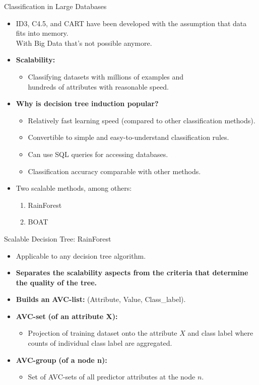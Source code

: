 \begin{frame}{Classification in Large Databases}
	\begin{itemize}
		\item ID3, C4.5, and CART have been developed with the assumption that data fits into memory.\\With Big Data that's not possible anymore.
		\item \textbf{Scalability:}
		      \begin{itemize}
			      \item Classifying datasets with millions of examples and \\ hundreds of attributes with reasonable speed.
		      \end{itemize}
		\item \textbf{Why is decision tree induction popular?}
		      \begin{itemize}
			      \item Relatively fast learning speed (compared to other classification methods).
			      \item Convertible to simple and easy-to-understand classification rules.
			      \item Can use SQL queries for accessing databases.
			      \item Classification accuracy comparable with other methods.
		      \end{itemize}
		\item Two scalable methods, among others:
		      \begin{enumerate}
			      \item RainForest
			      \item BOAT
		      \end{enumerate}
	\end{itemize}
\end{frame}

\begin{frame}{Scalable Decision Tree: RainForest}
	\begin{itemize}
		\item Applicable to any decision tree algorithm.
		\item \textbf{Separates the scalability aspects from the criteria that determine the quality of the tree.}
		\item \textbf{Builds an} \textbf{\color{airforceblue}AVC-list:} (Attribute, Value, Class\_label).
		\item \textbf{\color{airforceblue}AVC-set} \textbf{(of an attribute X):}
		      \begin{itemize}
			      \item Projection of training dataset onto the attribute $X$ and class label where counts of individual class label are aggregated.
		      \end{itemize}
		\item \textbf{\color{airforceblue}AVC-group} \textbf{(of a node n):}
		      \begin{itemize}
			      \item Set of AVC-sets of all predictor attributes at the node $n$.
		      \end{itemize}
	\end{itemize}
\end{frame}

